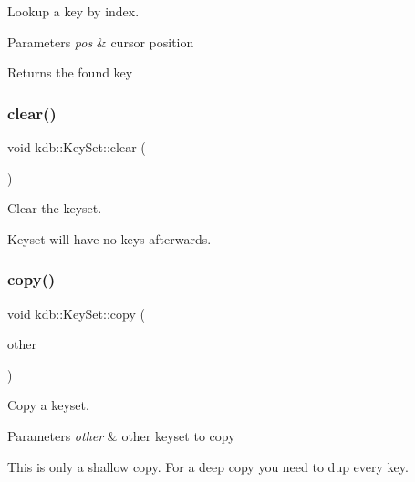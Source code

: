 Lookup a key by index. 


\begin{DoxyParams}{Parameters}
{\em pos} & cursor position\\
\hline
\end{DoxyParams}
\begin{DoxyReturn}{Returns}
the found key 
\end{DoxyReturn}
\mbox{\label{classkdb_1_1KeySet_a38f5159e39758aa632421d2fe7440633}} 
\subsubsection{\texorpdfstring{clear()}{clear()}}
{\footnotesize\ttfamily void kdb\+::\+Key\+Set\+::clear (\begin{DoxyParamCaption}{ }\end{DoxyParamCaption})\hspace{0.3cm}{\ttfamily [inline]}}



Clear the keyset. 

Keyset will have no keys afterwards. \mbox{\label{classkdb_1_1KeySet_a28fd33fdaecf1d57d4dddac7058f5d38}} 
\subsubsection{\texorpdfstring{copy()}{copy()}}
{\footnotesize\ttfamily void kdb\+::\+Key\+Set\+::copy (\begin{DoxyParamCaption}\item[{const \hyperlink{classkdb_1_1KeySet}{Key\+Set} \&}]{other }\end{DoxyParamCaption})\hspace{0.3cm}{\ttfamily [inline]}}



Copy a keyset. 


\begin{DoxyParams}{Parameters}
{\em other} & other keyset to copy\\
\hline
\end{DoxyParams}
This is only a shallow copy. For a deep copy you need to dup every key.

